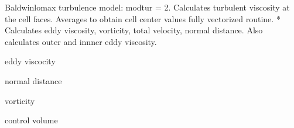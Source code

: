 \documentclass[letterpaper,10pt,english]{sphinxmanual}
\begin{document}
\begin{fulllineitems}
\label{\detokenize{autoapi/BaldwinLomax/index:BaldwinLomax.turbulent_viscosity}}
\sphinxAtStartPar
Baldwin\sphinxhyphen{}lomax turbulence model:  modtur = 2.
Calculates turbulent viscosity at the cell faces.
Averages to obtain cell center values fully vectorized routine.                                         *
Calculates eddy viscosity, vorticity, total velocity, normal distance.
Also calculates outer and innner eddy viscosity.

\begin{fulllineitems}
\label{\detokenize{autoapi/BaldwinLomax/index:BaldwinLomax.rev}}
\sphinxAtStartPar
eddy viscocity

\end{fulllineitems}


\begin{fulllineitems}
\label{\detokenize{autoapi/BaldwinLomax/index:BaldwinLomax.ylen}}
\sphinxAtStartPar
normal distance

\end{fulllineitems}


\begin{fulllineitems}
\label{\detokenize{autoapi/BaldwinLomax/index:BaldwinLomax.vor}}
\sphinxAtStartPar
vorticity

\end{fulllineitems}


\begin{fulllineitems}
\label{\detokenize{autoapi/BaldwinLomax/index:BaldwinLomax.vol}}
\sphinxAtStartPar
control volume


\end{fulllineitems}
\end{fulllineitems}
\end{document}
